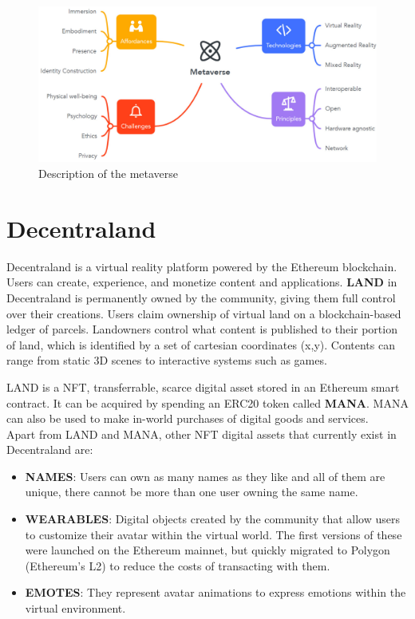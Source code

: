\documentclass[MSE,Master,english]{twbook}%
\begin{document}
\begin{figure}[H]
  \centering
  \includegraphics[width=\textwidth]{metaverse.png}
  \caption{Description of the metaverse \cite{metaverse}}
  \label{fig:metaverse}
\end{figure}

\section{Decentraland}
Decentraland\cite{DCLWhitepaper} is a virtual reality platform powered by the Ethereum blockchain. Users can create, experience, and monetize content and applications. \textbf{\gls{LAND}} in Decentraland is permanently owned by the community, giving them full control over their creations. Users claim ownership of virtual land on a blockchain-based ledger of parcels. Landowners control what content is published to their portion of land, which is identified by a set of cartesian coordinates (x,y). Contents can range from static 3D scenes to interactive systems such as games. 

LAND\cite{DCLWhitepaper} is a \ac{NFT}, transferrable, scarce digital asset stored in an Ethereum smart contract. It can be acquired by spending an ERC20 token called \textbf{\gls{MANA}}. \gls{MANA} can also be used to make in-world purchases of digital goods and services. \\

Apart from \gls{LAND} and \gls{MANA}, other \gls{NFT} digital assets that currently exist in Decentraland are:

\begin{itemize}
  \item \textbf{NAMES}: Users can own as many names as they like and all of them are unique, there cannot be more than one user owning the same name.
  \item \textbf{WEARABLES}: Digital objects created by the community that allow users to customize their avatar within the virtual world. The first versions of these were launched on the Ethereum mainnet, but quickly migrated to Polygon (Ethereum's \gls{L2}) to reduce the costs of transacting with them.
  \item \textbf{EMOTES}: They represent avatar animations to express emotions within the virtual environment.
\end{itemize}
\end{document}
